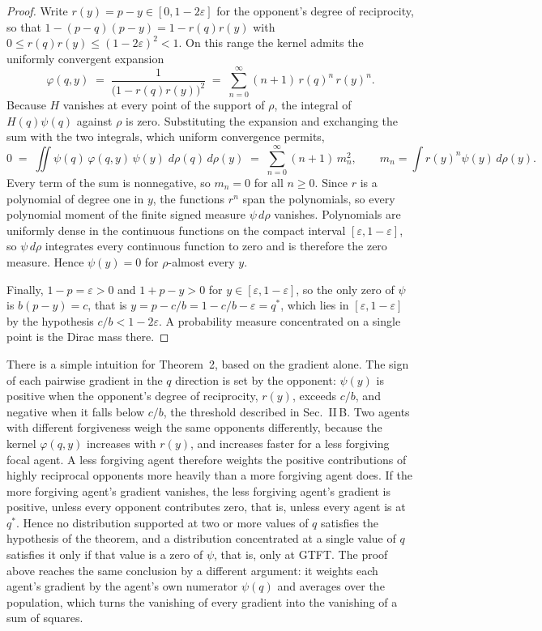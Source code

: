 \documentclass[10pt]{article}
\newcommand{\eps}{\varepsilon}
\begin{document}
\begin{proof}
Write $r(y) = p-y \in [0, 1-2\eps]$ for the opponent's degree of reciprocity, so that $1-(p-q)(p-y) = 1 - r(q)r(y)$ with $0 \le r(q)r(y) \le (1-2\eps)^2 < 1$.
On this range the kernel admits the uniformly convergent expansion
\[
    \varphi(q,y) \;=\; \frac{1}{\big(1-r(q)r(y)\big)^{2}} \;=\; \sum_{n=0}^{\infty}(n+1)\,r(q)^{n}\,r(y)^{n}.
\]
Because $H$ vanishes at every point of the support of $\rho$, the integral of $H(q)\psi(q)$ against $\rho$ is zero.
Substituting the expansion and exchanging the sum with the two integrals, which uniform convergence permits,
\[
    0 \;=\; \iint \psi(q)\,\varphi(q,y)\,\psi(y)\; d\rho(q)\, d\rho(y)
    \;=\; \sum_{n=0}^{\infty}(n+1)\,m_{n}^{2},
    \qquad m_{n} = \int r(y)^{n}\psi(y)\, d\rho(y).
\]
Every term of the sum is nonnegative, so $m_{n}=0$ for all $n \ge 0$. Since $r$ is a polynomial of degree one in $y$, the functions $r^{n}$ span the polynomials, so every polynomial moment of the finite signed measure $\psi \, d\rho$ vanishes.
Polynomials are uniformly dense in the continuous functions on the compact interval $[\eps, 1-\eps]$, so $\psi\, d\rho$ integrates every continuous function to zero and is therefore the zero measure. Hence $\psi(y) = 0$ for $\rho$-almost every $y$.

Finally, $1-p = \eps > 0$ and $1+p-y > 0$ for $y \in [\eps,1-\eps]$, so the only zero of $\psi$ is $b(p-y) = c$, that is $y = p - c/b = 1-c/b-\eps = q^{*}$, which lies in $[\eps,1-\eps]$ by the hypothesis $c/b < 1-2\eps$.
A probability measure concentrated on a single point is the Dirac mass there.
\end{proof}

There is a simple intuition for Theorem~2, based on the gradient alone.
The sign of each pairwise gradient in the $q$ direction is set by the opponent: $\psi(y)$ is positive when the opponent's degree of reciprocity, $r(y)$, exceeds $c/b$, and negative when it falls below $c/b$, the threshold described in Sec.~II\,B.
Two agents with different forgiveness weigh the same opponents differently, because the kernel $\varphi(q,y)$ increases with $r(y)$, and increases faster for a less forgiving focal agent.
A less forgiving agent therefore weights the positive contributions of highly reciprocal opponents more heavily than a more forgiving agent does.
If the more forgiving agent's gradient vanishes, the less forgiving agent's gradient is positive, unless every opponent contributes zero, that is, unless every agent is at $q^{*}$.
Hence no distribution supported at two or more values of $q$ satisfies the hypothesis of the theorem, and a distribution concentrated at a single value of $q$ satisfies it only if that value is a zero of $\psi$, that is, only at GTFT.
The proof above reaches the same conclusion by a different argument: it weights each agent's gradient by the agent's own numerator $\psi(q)$ and averages over the population, which turns the vanishing of every gradient into the
vanishing of a sum of squares.
\end{document}

